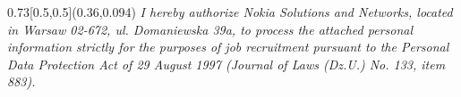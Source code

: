 \documentclass[11pt,a4paper,sans]{moderncv} %
\begin{document}

\begin{comment}
\section{Extra}
\cvlistitem{I'm an active member of game programming academic circle \emph{\href{http://tkgames.pwr.wroc.pl/site/}{TKGames}}.}
\cvlistitem{\small During the college me and my friend are creating a series of simple fun mini-games. We called ourselves Disassembly Entertainment.\\
\small\href{http://dissent.c0.pl/}{Our temporary Internet site - www.DissEnt.c0.pl}}
\end{comment}

\closesection{}
\renewcommand{\listitemsymbol}{-} %


\begin{comment}
\clearpage
\recipient{Company Recruitment team}{Company, Inc.\\123 somestreet\\some city}
\date{January 01, 1984}
\opening{Dear Sir or Madam,}
\closing{Yours faithfully,}
\enclosure[Attached]{curriculum vit\ae{}}
\makelettertitle

Lorem ipsum dolor sit amet, consectetur adipiscing elit.

\makeletterclosing
\end{comment}


\begin{textblock}{0.73}[0.5,0.5](0.36,0.094)
\color{gray}\scriptsize{\emph{I hereby authorize Nokia Solutions and Networks, located in Warsaw 02-672, ul. Domaniewska 39a, to process the attached personal information strictly for the purposes of job recruitment pursuant to the Personal Data Protection Act of 29 August 1997 (Journal of Laws (Dz.U.) No. 133, item 883).}} \color{black}
\end{textblock}
\end{document}
